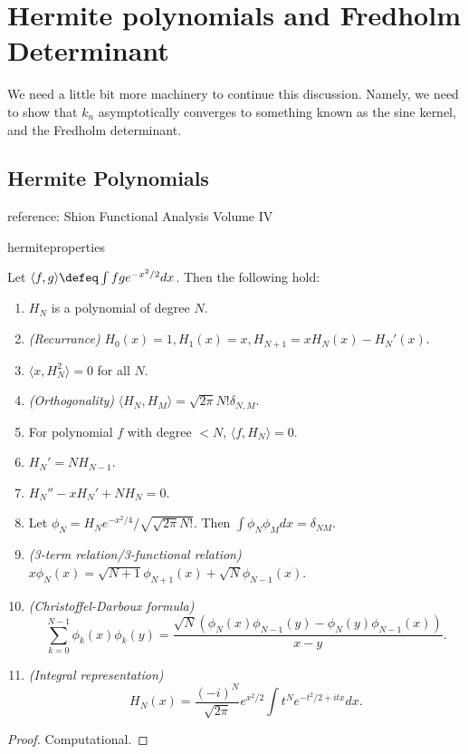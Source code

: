 \section{Hermite polynomials and Fredholm Determinant}

We need a little bit more machinery to continue this discussion. Namely, we need to show that $k_n$ asymptotically converges to something known as the sine kernel, and the Fredholm determinant.
\subsection*{Hermite Polynomials}
reference: Shion Functional Analysis Volume IV

\begin{aproposition}[breakable]{}{hermiteproperties}
    
    Let $\langle f,g\rangle\defeq \int fg e^{-x^2/2}dx$. Then the following hold:
    \begin{enumerate}
        \item $H_N$ is a polynomial of degree $N$.
        \item \textit{(Recurrance)} $H_0(x)=1,H_1(x)=x,H_{N+1}=xH_N(x)-H_N'(x)$.
        \item $\langle x, H_N^2\rangle=0$ for all $N$.
        \item \textit{(Orthogonality)} $\langle H_N, H_M\rangle =\sqrt{2\pi} N!\delta_{N,M}$.
        \item For polynomial $f$ with degree $<N$, $\langle f, H_N\rangle =0$.
        \item $H_N'=N H_{N-1}$.
        \item $H_N''-x H_{N}'+NH_N=0$.
        \item Let $\phi_N=H_N e^{-x^2/4}/\sqrt{\sqrt{2\pi}N!}$. Then $\int \phi_N \phi_Mdx = \delta_{NM}$.
        \item \textit{(3-term relation/3-functional relation)} $x\phi_N(x) = \sqrt{N+1} \phi_{N+1}(x)+\sqrt{N}\phi_{N-1}(x)$.
        \item \textit{(Christoffel-Darboux formula)} \[
            \sum_{k=0}^{N-1}\phi_k(x)\phi_k(y) = \frac{\sqrt{N}(\phi_N(x)\phi_{N-1}(y)-\phi_N(y)\phi_{N-1}(x))}{x-y}.
        \] 
        \item \textit{(Integral representation)} \[
        H_N(x)=\frac{(-i)^N}{\sqrt{2\pi}} e^{x^2/2}\int t^N e^{-t^2/2+itx}dx.
        \]
        
    \end{enumerate}

\end{aproposition}
\begin{proof}
    Computational.


\end{proof}


